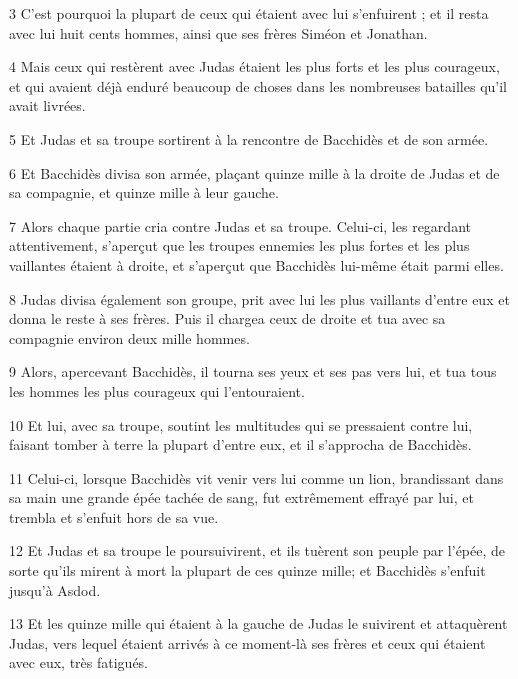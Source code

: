\par 3 C'est pourquoi la plupart de ceux qui étaient avec lui s'enfuirent ; et il resta avec lui huit cents hommes, ainsi que ses frères Siméon et Jonathan.

\par 4 Mais ceux qui restèrent avec Judas étaient les plus forts et les plus courageux, et qui avaient déjà enduré beaucoup de choses dans les nombreuses batailles qu'il avait livrées.

\par 5 Et Judas et sa troupe sortirent à la rencontre de Bacchidès et de son armée.

\par 6 Et Bacchidès divisa son armée, plaçant quinze mille à la droite de Judas et de sa compagnie, et quinze mille à leur gauche.

\par 7 Alors chaque partie cria contre Judas et sa troupe. Celui-ci, les regardant attentivement, s'aperçut que les troupes ennemies les plus fortes et les plus vaillantes étaient à droite, et s'aperçut que Bacchidès lui-même était parmi elles.

\par 8 Judas divisa également son groupe, prit avec lui les plus vaillants d'entre eux et donna le reste à ses frères. Puis il chargea ceux de droite et tua avec sa compagnie environ deux mille hommes.

\par 9 Alors, apercevant Bacchidès, il tourna ses yeux et ses pas vers lui, et tua tous les hommes les plus courageux qui l'entouraient.

\par 10 Et lui, avec sa troupe, soutint les multitudes qui se pressaient contre lui, faisant tomber à terre la plupart d'entre eux, et il s'approcha de Bacchidès.

\par 11 Celui-ci, lorsque Bacchidès vit venir vers lui comme un lion, brandissant dans sa main une grande épée tachée de sang, fut extrêmement effrayé par lui, et trembla et s'enfuit hors de sa vue.

\par 12 Et Judas et sa troupe le poursuivirent, et ils tuèrent son peuple par l'épée, de sorte qu'ils mirent à mort la plupart de ces quinze mille; et Bacchidès s'enfuit jusqu'à Asdod.

\par 13 Et les quinze mille qui étaient à la gauche de Judas le suivirent et attaquèrent Judas, vers lequel étaient arrivés à ce moment-là ses frères et ceux qui étaient avec eux, très fatigués.

